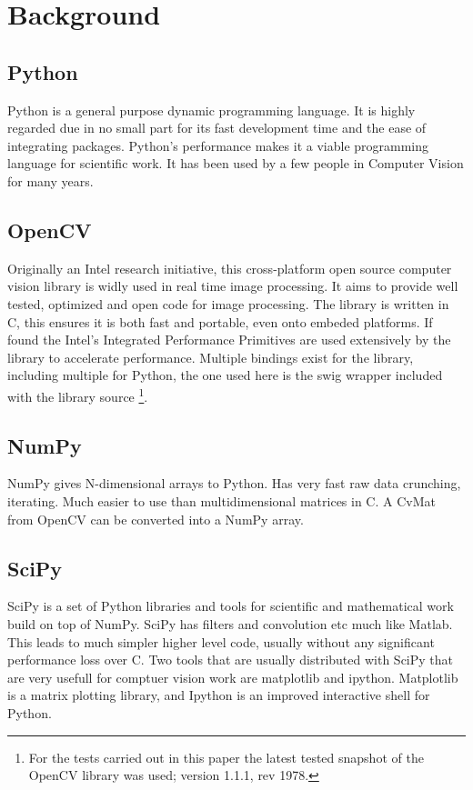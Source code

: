 \documentclass[english]{IEEEtran}
\theoremstyle{plain}
\begin{document}
\section{Background}


\subsection{Python}

Python is a general purpose dynamic programming language\cite{entry-0}.
It is highly regarded due in no small part for its fast development
time and the ease of integrating packages\cite{sanner1999python}.
Python's performance makes it a viable programming language for scientific
work\cite{cai2005performance}. It has been used by a few people in
Computer Vision for many years\cite{doakPyCV}.


\subsection{OpenCV}

Originally an Intel research initiative, this cross-platform open
source computer vision library is widly used in real time image processing.
It aims to provide well tested, optimized and open code for image
processing. The library is written in C, this ensures it is both fast
and portable, even onto embeded platforms. If found the Intel's Integrated
Performance Primitives are used extensively by the library to accelerate
performance. Multiple bindings exist for the library, including multiple
for Python, the one used here is the swig\cite{beazley1996swig} wrapper
included with the library source%
\footnote{For the tests carried out in this paper the latest tested snapshot
of the OpenCV library was used; version 1.1.1, rev 1978.%
}.


\subsection{NumPy}

NumPy gives N-dimensional arrays to Python\cite{oliphant2006guide}.
Has very fast raw data crunching, iterating. Much easier to use than
multidimensional matrices in C. A CvMat from OpenCV can be converted
into a NumPy array. 


\subsection{SciPy}

SciPy\cite{jones2001scipy} is a set of Python libraries and tools
for scientific and mathematical work build on top of NumPy\cite{oliphant2007python}.
SciPy has filters and convolution etc much like Matlab. This leads
to much simpler higher level code, usually without any significant
performance loss over C. Two tools that are usually distributed with
SciPy that are very usefull for comptuer vision work are matplotlib
and ipython. Matplotlib\cite{hunter2007matplotlib} is a matrix plotting
library, and Ipython is an improved interactive shell for Python\cite{perez2007ipython}.
\end{document}
